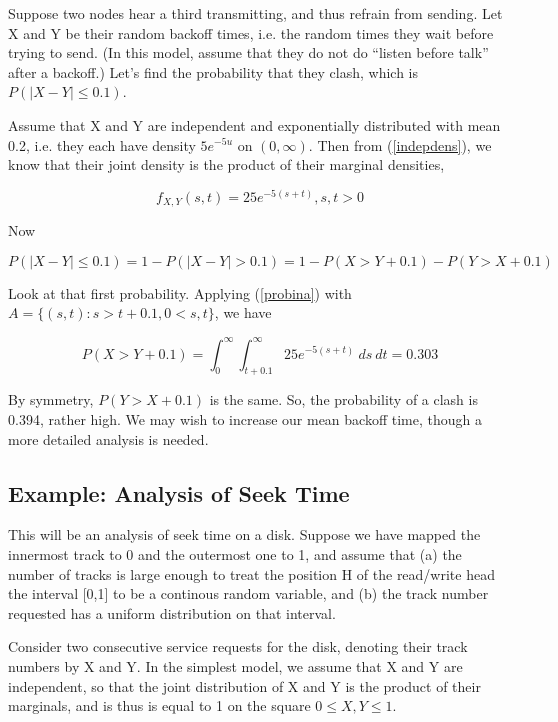 Suppose two nodes hear a third transmitting, and thus refrain from
sending.  Let X and Y be their random backoff times, i.e. the random
times they wait before trying to send.  (In this model, assume that they
do not do ``listen before talk'' after a backoff.) Let's find the
probability that they clash, which is $P(|X - Y| \leq 0.1)$.  

Assume that X and Y are independent and exponentially distributed with
mean 0.2, i.e. they each have density $5e^{-5u}$ on $(0,\infty)$.
Then from (\ref{indepdens}), we know that their joint density
is the product of their marginal densities, 

\begin{equation}
f_{X,Y}(s,t) = 25 e^{-5(s+t)}, s,t > 0
\end{equation}

Now

\begin{equation}
P(|X - Y| \leq 0.1) = 1 - P(|X - Y| > 0.1)
= 1 - P(X > Y + 0.1) - P(Y > X + 0.1) 
\end{equation}

Look at that first probability.  Applying (\ref{probina}) with $A =
\{(s,t): s > t + 0.1, 0 < s,t\}$, we have

\begin{equation}
P(X > Y + 0.1) =
\int_{0}^{\infty} \int_{t+0.1}^{\infty} 25 e^{-5(s+t)} ~ ds ~ dt = 0.303
\end{equation}

By symmetry, $P(Y > X + 0.1)$ is the same.  So, the probability of a
clash is 0.394, rather high.  We may wish to increase our mean backoff
time, though a more detailed analysis is needed.

\subsection{Example:  Analysis of Seek Time}

This will be an analysis of seek time on a disk.  Suppose we have mapped
the innermost track to 0 and the outermost one to 1, and assume that (a)
the number of tracks is large enough to treat the position H of the
read/write head the interval [0,1] to be a continous random variable,
and (b) the track number requested has a uniform distribution on that
interval.

Consider two consecutive service requests for the disk, denoting their
track numbers by X and Y.  In the simplest model, we assume that X and Y
are independent, so that  the joint distribution of X and Y is the
product of their marginals, and is thus is equal to 1 on the square $0
\leq X,Y \leq 1$.

